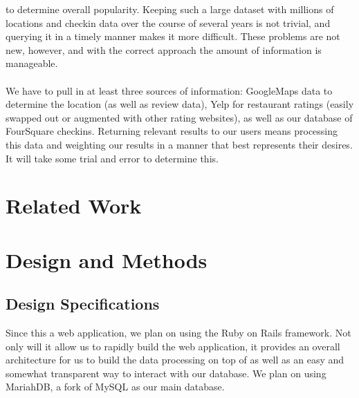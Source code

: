 \documentclass{article}
\begin{document}
to determine overall popularity. Keeping such a large dataset with millions of locations and checkin
data over the course of several years is not trivial, and querying it in a timely manner makes it more
difficult. These problems are not new, however, and with the correct approach the amount of information is manageable.
\\ \\
We have to pull in at least three sources of information: GoogleMaps data to determine the location (as
well as review data), Yelp for restaurant ratings (easily swapped out or augmented with other rating
websites), as well as our database of FourSquare checkins. Returning relevant results to our users means
processing this data and weighting our results in a manner that best represents their desires. It will
take some trial and error to determine this.

\section{Related Work}

\section{Design and Methods}
\subsection{Design Specifications}
Since this a web application, we plan on using the Ruby on Rails framework. Not only will it allow us
to rapidly build the web application, it provides an overall architecture for us to build the data processing
on top of as well as an easy and somewhat transparent way to interact with our database. We plan on using
MariahDB, a fork of MySQL as our main database.

\end{document}
